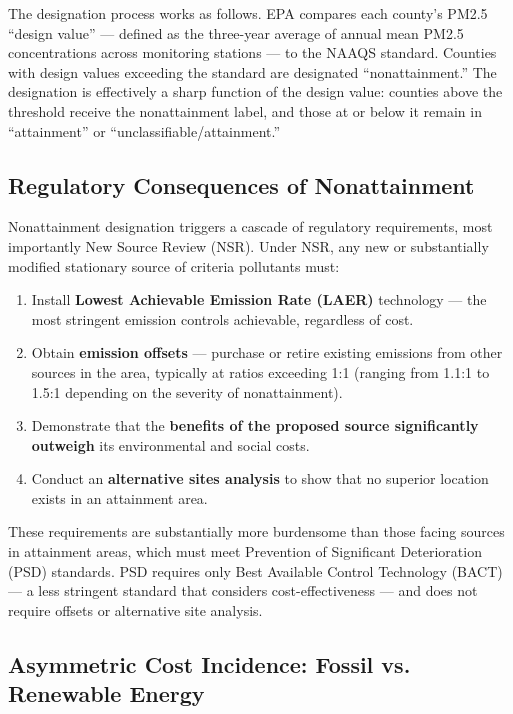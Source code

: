 \documentclass[12pt]{article}
\begin{document}
The designation process works as follows. EPA compares each county's PM2.5 ``design value'' --- defined as the three-year average of annual mean PM2.5 concentrations across monitoring stations --- to the NAAQS standard. Counties with design values exceeding the standard are designated ``nonattainment.'' The designation is effectively a sharp function of the design value: counties above the threshold receive the nonattainment label, and those at or below it remain in ``attainment'' or ``unclassifiable/attainment.''

\subsection{Regulatory Consequences of Nonattainment}

Nonattainment designation triggers a cascade of regulatory requirements, most importantly New Source Review (NSR). Under NSR, any new or substantially modified stationary source of criteria pollutants must:

\begin{enumerate}
    \item Install \textbf{Lowest Achievable Emission Rate (LAER)} technology --- the most stringent emission controls achievable, regardless of cost.
    \item Obtain \textbf{emission offsets} --- purchase or retire existing emissions from other sources in the area, typically at ratios exceeding 1:1 (ranging from 1.1:1 to 1.5:1 depending on the severity of nonattainment).
    \item Demonstrate that the \textbf{benefits of the proposed source significantly outweigh} its environmental and social costs.
    \item Conduct an \textbf{alternative sites analysis} to show that no superior location exists in an attainment area.
\end{enumerate}

These requirements are substantially more burdensome than those facing sources in attainment areas, which must meet Prevention of Significant Deterioration (PSD) standards. PSD requires only Best Available Control Technology (BACT) --- a less stringent standard that considers cost-effectiveness --- and does not require offsets or alternative site analysis.

\subsection{Asymmetric Cost Incidence: Fossil vs. Renewable Energy}
\end{document}
